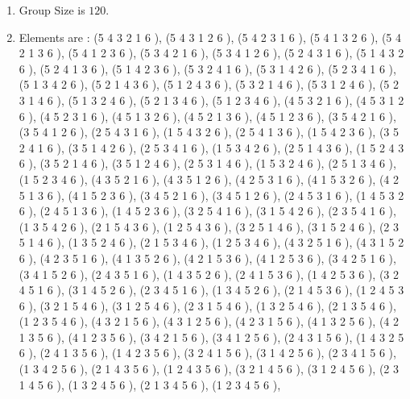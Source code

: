\documentclass[12pt]{article}
\begin{document}
\begin{enumerate}
\item Group Size is $120$.
\item Elements are : (5 4 3 2 1 6  ), (5 4 3 1 2 6  ), (5 4 2 3 1 6  ), (5 4 1 3 2 6  ), (5 4 2 1 3 6  ), (5 4 1 2 3 6  ), (5 3 4 2 1 6  ), (5 3 4 1 2 6  ), (5 2 4 3 1 6  ), (5 1 4 3 2 6  ), (5 2 4 1 3 6  ), (5 1 4 2 3 6  ), (5 3 2 4 1 6  ), (5 3 1 4 2 6  ), (5 2 3 4 1 6  ), (5 1 3 4 2 6  ), (5 2 1 4 3 6  ), (5 1 2 4 3 6  ), (5 3 2 1 4 6  ), (5 3 1 2 4 6  ), (5 2 3 1 4 6  ), (5 1 3 2 4 6  ), (5 2 1 3 4 6  ), (5 1 2 3 4 6  ), (4 5 3 2 1 6  ), (4 5 3 1 2 6  ), (4 5 2 3 1 6  ), (4 5 1 3 2 6  ), (4 5 2 1 3 6  ), (4 5 1 2 3 6  ), (3 5 4 2 1 6  ), (3 5 4 1 2 6  ), (2 5 4 3 1 6  ), (1 5 4 3 2 6  ), (2 5 4 1 3 6  ), (1 5 4 2 3 6  ), (3 5 2 4 1 6  ), (3 5 1 4 2 6  ), (2 5 3 4 1 6  ), (1 5 3 4 2 6  ), (2 5 1 4 3 6  ), (1 5 2 4 3 6  ), (3 5 2 1 4 6  ), (3 5 1 2 4 6  ), (2 5 3 1 4 6  ), (1 5 3 2 4 6  ), (2 5 1 3 4 6  ), (1 5 2 3 4 6  ), (4 3 5 2 1 6  ), (4 3 5 1 2 6  ), (4 2 5 3 1 6  ), (4 1 5 3 2 6  ), (4 2 5 1 3 6  ), (4 1 5 2 3 6  ), (3 4 5 2 1 6  ), (3 4 5 1 2 6  ), (2 4 5 3 1 6  ), (1 4 5 3 2 6  ), (2 4 5 1 3 6  ), (1 4 5 2 3 6  ), (3 2 5 4 1 6  ), (3 1 5 4 2 6  ), (2 3 5 4 1 6  ), (1 3 5 4 2 6  ), (2 1 5 4 3 6  ), (1 2 5 4 3 6  ), (3 2 5 1 4 6  ), (3 1 5 2 4 6  ), (2 3 5 1 4 6  ), (1 3 5 2 4 6  ), (2 1 5 3 4 6  ), (1 2 5 3 4 6  ), (4 3 2 5 1 6  ), (4 3 1 5 2 6  ), (4 2 3 5 1 6  ), (4 1 3 5 2 6  ), (4 2 1 5 3 6  ), (4 1 2 5 3 6  ), (3 4 2 5 1 6  ), (3 4 1 5 2 6  ), (2 4 3 5 1 6  ), (1 4 3 5 2 6  ), (2 4 1 5 3 6  ), (1 4 2 5 3 6  ), (3 2 4 5 1 6  ), (3 1 4 5 2 6  ), (2 3 4 5 1 6  ), (1 3 4 5 2 6  ), (2 1 4 5 3 6  ), (1 2 4 5 3 6  ), (3 2 1 5 4 6  ), (3 1 2 5 4 6  ), (2 3 1 5 4 6  ), (1 3 2 5 4 6  ), (2 1 3 5 4 6  ), (1 2 3 5 4 6  ), (4 3 2 1 5 6  ), (4 3 1 2 5 6  ), (4 2 3 1 5 6  ), (4 1 3 2 5 6  ), (4 2 1 3 5 6  ), (4 1 2 3 5 6  ), (3 4 2 1 5 6  ), (3 4 1 2 5 6  ), (2 4 3 1 5 6  ), (1 4 3 2 5 6  ), (2 4 1 3 5 6  ), (1 4 2 3 5 6  ), (3 2 4 1 5 6  ), (3 1 4 2 5 6  ), (2 3 4 1 5 6  ), (1 3 4 2 5 6  ), (2 1 4 3 5 6  ), (1 2 4 3 5 6  ), (3 2 1 4 5 6  ), (3 1 2 4 5 6  ), (2 3 1 4 5 6  ), (1 3 2 4 5 6  ), (2 1 3 4 5 6  ), (1 2 3 4 5 6  ), 
\end{enumerate}
\end{document}
